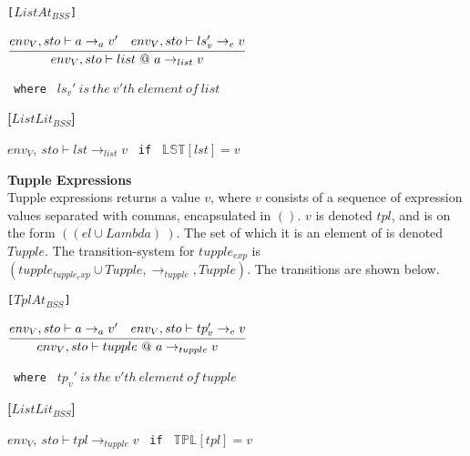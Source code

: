 {\texttt{[$ListAt_{BSS}$]}\\
\begin{center}
	\begin{math}
		\cfrac
			{env_V, sto \vdash a \rightarrow_{a} v' \quad env_V, sto \vdash ls_v' \rightarrow_e v}
			{env_V, sto \vdash list\ @\ a \rightarrow_{list} v}
	\end{math}
	
	\texttt{ where } $ls_v'\ is\ the\ v'th\ element\ of\ list$
\end{center}

\textbf{[$ListLit_{BSS}$]}\\
\begin{center}
	\begin{math}
	env_V,\ sto \vdash lst \rightarrow_{list} v
	\end{math}
	\texttt{ if } $\mathbb{LST}[lst] = v$
\end{center}

\textbf{\Large{Tupple Expressions}}\\
Tupple expressions returns a value $v$, where $v$ consists of a sequence of expression values separated with commas, encapsulated in $()$.
$v$ is denoted $tpl$, and is on the form $((el \cup Lambda)~)$.
The set of which it is an element of is denoted $Tupple$.
The transition-system for $tupple_{exp}$ is $(tupple_{tupple_exp} \cup Tupple, \rightarrow_{tupple}, Tupple)$.
The transitions are shown below.

\texttt{[$TplAt_{BSS}$]}\\
\begin{center}
	\begin{math}
	\cfrac
	{env_V, sto \vdash a \rightarrow_{a} v' \quad env_V, sto \vdash tp_v' \rightarrow_e v}
	{env_V, sto \vdash tupple\ @\ a \rightarrow_{tupple} v}
	\end{math}
	
	\texttt{ where } $tp_v'\ is\ the\ v'th\ element\ of\ tupple$
\end{center}

\textbf{[$ListLit_{BSS}$]}\\
\begin{center}
	\begin{math}
	env_V,\ sto \vdash tpl \rightarrow_{tupple} v
	\end{math}
	\texttt{ if } $\mathbb{TPL}[tpl] = v$
\end{center}


}
